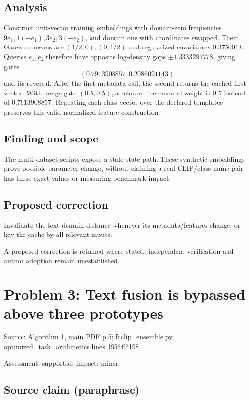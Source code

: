 \documentclass[11pt]{article}
\begin{document}
\subsection*{Analysis}

Construct unit-vector training embeddings with domain-zero frequencies \(9e_1,1(-e_1),3e_2,3(-e_2)\), and domain one with coordinates swapped. Their Gaussian means are \((1/2,0),(0,1/2)\) and regularized covariances \(0.375001I\). Queries \(e_1,e_2\) therefore have opposite log-density gaps \(\pm1.3333297778\), giving gates \[(0.7913908857,0.2086091143)\] and its reversal. After the first metadata call, the second returns the cached first vector. With image gate \((0.5,0.5)\), a relevant incremental weight is \(0.5\) instead of \(0.7913908857\). Repeating each class vector over the declared templates preserves this valid normalized-feature construction.

\subsection*{Finding and scope}

The multi-dataset scripts expose a stale-state path. These synthetic embeddings prove possible parameter change, without claiming a real CLIP/class-name pair has these exact values or measuring benchmark impact.

\subsection*{Proposed correction}

Invalidate the text-domain distance whenever its metadata/features change, or key the cache by all relevant inputs.

A proposed correction is retained where stated; independent verification and author adoption remain unestablished.

\section*{Problem 3: Text fusion is bypassed above three prototypes}

Source: Algorithm 1, main PDF p.5; fcclip\_ensemble.py, optimized\_task\_arithmetics lines 195â€“198

Assessment: supported; impact: minor

\subsection*{Source claim (paraphrase)}
\end{document}
